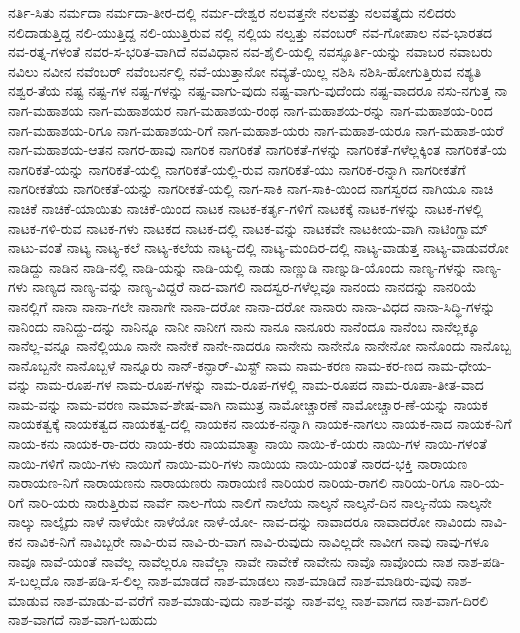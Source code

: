 {ನರ್ತಿ-ಸಿತು
ನರ್ಮದಾ
ನರ್ಮದಾ-ತೀರ-ದಲ್ಲಿ
ನರ್ಮ-ದೇಶ್ವರ
ನಲವತ್ತನೇ
ನಲವತ್ತು
ನಲವತ್ತೈದು
ನಲಿದರು
ನಲಿದಾಡುತ್ತಿದ್ದ
ನಲಿ-ಯುತ್ತಿದ್ದ
ನಲಿ-ಯುತ್ತಿರುವ
ನಲ್ಲಿ
ನಲ್ಲಿಯ
ನಲ್ವತ್ತು
ನವಂಬರ್
ನವ-ಗೋಪಾಲ
ನವ-ಭಾರತದ
ನವ-ರತ್ನ-ಗಳಂತೆ
ನವರ-ಸ-ಭರಿತ-ವಾಗಿದೆ
ನವವಿಧಾನ
ನವ-ಶೈಲಿ-ಯಲ್ಲಿ
ನವಸ್ಫೂರ್ತಿ-ಯನ್ನು
ನವಾಬರ
ನವಾಬರು
ನವಿಲು
ನವೀನ
ನವೆಂಬರ್
ನವೆಂಬರ್ನಲ್ಲಿ
ನವೆ-ಯುತ್ತಾನೋ
ನವ್ಯತೆ-ಯಿಲ್ಲ
ನಶಿಸಿ
ನಶಿಸಿ-ಹೋಗುತ್ತಿರುವ
ನಶ್ಯತಿ
ನಶ್ವರ-ತೆಯ
ನಷ್ಟ
ನಷ್ಟ-ಗಳ
ನಷ್ಟ-ಗಳನ್ನು
ನಷ್ಟ-ವಾಗು-ವುದು
ನಷ್ಟ-ವಾಗು-ವುದೆಂದು
ನಷ್ಟ-ವಾದರೂ
ನಸು-ನಗುತ್ತ
ನಾ
ನಾಗ-ಮಹಾಶಯ
ನಾಗ-ಮಹಾಶಯರ
ನಾಗ-ಮಹಾಶಯ-ರಂಥ
ನಾಗ-ಮಹಾಶಯ-ರನ್ನು
ನಾಗ-ಮಹಾಶಯ-ರಿಂದ
ನಾಗ-ಮಹಾಶಯ-ರಿಗೂ
ನಾಗ-ಮಹಾಶಯ-ರಿಗೆ
ನಾಗ-ಮಹಾಶ-ಯರು
ನಾಗ-ಮಹಾಶ-ಯರೂ
ನಾಗ-ಮಹಾಶ-ಯರೆ
ನಾಗ-ಮಹಾಶಯ-ಆತನ
ನಾಗರ-ಹಾವು
ನಾಗರಿಕ
ನಾಗರಿಕತೆ
ನಾಗರಿಕತೆ-ಗಳನ್ನು
ನಾಗರಿಕತೆ-ಗಳೆಲ್ಲಕ್ಕಿಂತ
ನಾಗರಿಕತೆ-ಯ
ನಾಗರಿಕತೆ-ಯನ್ನು
ನಾಗರಿಕತೆ-ಯಲ್ಲಿ
ನಾಗರಿಕತೆ-ಯಲ್ಲಿ-ರುವ
ನಾಗರಿಕತೆ-ಯು
ನಾಗರಿಕ-ರನ್ನಾಗಿ
ನಾಗರೀಕತೆಗೆ
ನಾಗರೀಕತೆಯ
ನಾಗರೀಕತೆ-ಯನ್ನು
ನಾಗರೀಕತೆ-ಯಲ್ಲಿ
ನಾಗ-ಸಾಕಿ
ನಾಗ-ಸಾಕಿ-ಯಿಂದ
ನಾಗಸ್ವರದ
ನಾಗಿಯೂ
ನಾಚಿ
ನಾಚಿಕೆ
ನಾಚಿಕೆ-ಯಾಯಿತು
ನಾಚಿಕೆ-ಯಿಂದ
ನಾಟಕ
ನಾಟಕ-ಕರ್ತೃ-ಗಳಿಗೆ
ನಾಟಕಕ್ಕೆ
ನಾಟಕ-ಗಳನ್ನು
ನಾಟಕ-ಗಳಲ್ಲಿ
ನಾಟಕ-ಗಳಿ-ರುವ
ನಾಟಕ-ಗಳು
ನಾಟಕದ
ನಾಟಕ-ದಲ್ಲಿ
ನಾಟಕ-ವನ್ನು
ನಾಟಕವೇ
ನಾಟಕೀಯ-ವಾಗಿ
ನಾಟಿಂಗ್ಹಾಮ್
ನಾಟು-ವಂತೆ
ನಾಟ್ಯ
ನಾಟ್ಯ-ಕಲೆ
ನಾಟ್ಯ-ಕಲೆಯ
ನಾಟ್ಯ-ದಲ್ಲಿ
ನಾಟ್ಯ-ಮಂದಿರ-ದಲ್ಲಿ
ನಾಟ್ಯ-ವಾಡುತ್ತ
ನಾಟ್ಯ-ವಾಡುವರೋ
ನಾಡಿದ್ದು
ನಾಡಿನ
ನಾಡಿ-ನಲ್ಲಿ
ನಾಡಿ-ಯನ್ನು
ನಾಡಿ-ಯಲ್ಲಿ
ನಾಡು
ನಾಣ್ಣುಡಿ
ನಾಣ್ನುಡಿ-ಯೊಂದು
ನಾಣ್ಯ-ಗಳನ್ನು
ನಾಣ್ಯ-ಗಳು
ನಾಣ್ಯದ
ನಾಣ್ಯ-ವನ್ನು
ನಾಣ್ಯ-ವಿದ್ದರೆ
ನಾದ-ವಾಗಲಿ
ನಾದಸ್ವರ-ಗಳೆಲ್ಲವೂ
ನಾನಂದು
ನಾನದನ್ನು
ನಾನರಿಯೆ
ನಾನಲ್ಲಿಗೆ
ನಾನಾ
ನಾನಾ-ಗಲೇ
ನಾನಾಗೇ
ನಾನಾ-ದರೋ
ನಾನಾ-ದರೋ
ನಾನಾರು
ನಾನಾ-ವಿಧದ
ನಾನಾ-ಸಿದ್ಧಿ-ಗಳನ್ನು
ನಾನಿಂದು
ನಾನಿದ್ದು-ದನ್ನು
ನಾನಿನ್ನೂ
ನಾನೀ
ನಾನೀಗ
ನಾನು
ನಾನೂ
ನಾನೂರು
ನಾನೆಂದೂ
ನಾನೆಂಬ
ನಾನೆಲ್ಲಕ್ಕೂ
ನಾನೆಲ್ಲ-ವನ್ನೂ
ನಾನೆಲ್ಲಿಯೂ
ನಾನೇ
ನಾನೇಕೆ
ನಾನೇ-ನಾದರೂ
ನಾನೇನು
ನಾನೇನೊ
ನಾನೇನೋ
ನಾನೊಂದು
ನಾನೊಬ್ಬ
ನಾನೊಬ್ಬನೇ
ನಾನೊಬ್ಬಳೆ
ನಾನ್ನೂರು
ನಾನ್-ಕನ್ಫಾರ್-ಮಿಸ್ಟ್
ನಾಮ
ನಾಮ-ಕರಣ
ನಾಮ-ಕರ-ಣದ
ನಾಮ-ಧೇಯ-ವನ್ನು
ನಾಮ-ರೂಪ-ಗಳ
ನಾಮ-ರೂಪ-ಗಳನ್ನು
ನಾಮ-ರೂಪ-ಗಳಲ್ಲಿ
ನಾಮ-ರೂಪದ
ನಾಮ-ರೂಪಾ-ತೀತ-ವಾದ
ನಾಮ-ವನ್ನು
ನಾಮ-ವರಣ
ನಾಮಾವ-ಶೇಷ-ವಾಗಿ
ನಾಮುತ್ರ
ನಾಮೋಚ್ಚಾರಣೆ
ನಾಮೋಚ್ಚಾರ-ಣೆ-ಯನ್ನು
ನಾಯಕ
ನಾಯಕತ್ವಕ್ಕೆ
ನಾಯಕತ್ವದ
ನಾಯಕತ್ವ-ದಲ್ಲಿ
ನಾಯಕನ
ನಾಯಕ-ನನ್ನಾಗಿ
ನಾಯಕ-ನಾಗಲು
ನಾಯಕ-ನಾದ
ನಾಯಕ-ನಿಗೆ
ನಾಯ-ಕನು
ನಾಯಕ-ರಾ-ದರು
ನಾಯ-ಕರು
ನಾಯಮಾತ್ಮಾ
ನಾಯಿ
ನಾಯಿ-ಕೆ-ಯರು
ನಾಯಿ-ಗಳ
ನಾಯಿ-ಗಳಂತೆ
ನಾಯಿ-ಗಳಿಗೆ
ನಾಯಿ-ಗಳು
ನಾಯಿಗೆ
ನಾಯಿ-ಮರಿ-ಗಳು
ನಾಯಿಯ
ನಾಯಿ-ಯಂತೆ
ನಾರದ-ಭಕ್ತಿ
ನಾರಾಯಣ
ನಾರಾಯಣ-ನಿಗೆ
ನಾರಾಯಣನು
ನಾರಾಯಣರು
ನಾರಾಯಣಿ
ನಾರಿಯರ
ನಾರಿಯ-ರಾಗಲಿ
ನಾರಿಯ-ರಿಗೂ
ನಾರಿ-ಯ-ರಿಗೆ
ನಾರಿ-ಯರು
ನಾರುತ್ತಿರುವ
ನಾರ್ವೆ
ನಾಲ-ಗೆಯ
ನಾಲಿಗೆ
ನಾಲೆಯ
ನಾಲ್ಕನೆ
ನಾಲ್ಕನೆ-ದಿನ
ನಾಲ್ಕ-ನೆಯ
ನಾಲ್ಕನೇ
ನಾಲ್ಕು
ನಾಲ್ಕೈದು
ನಾಳೆ
ನಾಳೆಯೇ
ನಾಳೆಯೋ
ನಾಳೆ-ಯೋ-
ನಾವ-ದನ್ನು
ನಾವಾದರೂ
ನಾವಾದರೋ
ನಾವಿಂದು
ನಾವಿ-ಕನ
ನಾವಿಕ-ನಿಗೆ
ನಾವಿಬ್ಬರೇ
ನಾವಿ-ರುವ
ನಾವಿ-ರು-ವಾಗ
ನಾವಿ-ರುವುದು
ನಾವಿಲ್ಲದೇ
ನಾವೀಗ
ನಾವು
ನಾವು-ಗಳೂ
ನಾವೂ
ನಾವೆ-ಯಂತೆ
ನಾವೆಲ್ಲ
ನಾವೆಲ್ಲರೂ
ನಾವೆಲ್ಲಾ
ನಾವೇ
ನಾವೇಕೆ
ನಾವೇನು
ನಾವೊ
ನಾವೊಂದು
ನಾಶ
ನಾಶ-ಪಡಿ-ಸ-ಬಲ್ಲದೊ
ನಾಶ-ಪಡಿ-ಸ-ಲಿಲ್ಲ
ನಾಶ-ಮಾಡದೆ
ನಾಶ-ಮಾಡಲು
ನಾಶ-ಮಾಡಿದೆ
ನಾಶ-ಮಾಡಿರು-ವುವು
ನಾಶ-ಮಾಡುವ
ನಾಶ-ಮಾಡು-ವ-ವರೆಗೆ
ನಾಶ-ಮಾಡು-ವುದು
ನಾಶ-ವನ್ನು
ನಾಶ-ವಲ್ಲ
ನಾಶ-ವಾಗದ
ನಾಶ-ವಾಗ-ದಿರಲಿ
ನಾಶ-ವಾಗದೆ
ನಾಶ-ವಾಗ-ಬಹುದು
}
